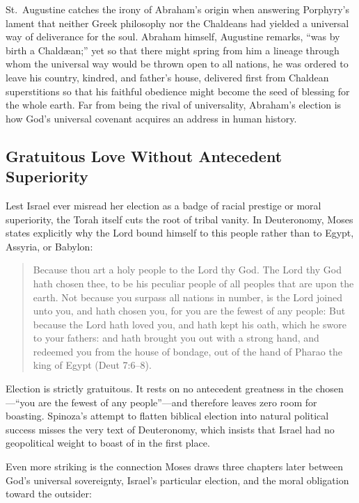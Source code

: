 St.\ Augustine catches the irony of Abraham's origin when answering Porphyry's lament that neither Greek philosophy nor the Chaldeans had yielded a universal way of deliverance for the soul. Abraham himself, Augustine remarks, ``was by birth a Chald\ae an;'' yet so that there might spring from him a lineage through whom the universal way would be thrown open to all nations, he was ordered to leave his country, kindred, and father's house, delivered first from Chaldean superstitions so that his faithful obedience might become the seed of blessing for the whole earth. Far from being the rival of universality, Abraham's election is how God's universal covenant acquires an address in human history.

\subsection{Gratuitous Love Without Antecedent Superiority}

Lest Israel ever misread her election as a badge of racial prestige or moral superiority, the Torah itself cuts the root of tribal vanity. In Deuteronomy, Moses states explicitly why the Lord bound himself to this people rather than to Egypt, Assyria, or Babylon:

\begin{quote}
Because thou art a holy people to the Lord thy God. The Lord thy God hath chosen thee, to be his peculiar people of all peoples that are upon the earth. Not because you surpass all nations in number, is the Lord joined unto you, and hath chosen you, for you are the fewest of any people: But because the Lord hath loved you, and hath kept his oath, which he swore to your fathers: and hath brought you out with a strong hand, and redeemed you from the house of bondage, out of the hand of Pharao the king of Egypt (Deut 7:6--8).
\end{quote}

Election is strictly gratuitous. It rests on no antecedent greatness in the chosen---``you are the fewest of any people''---and therefore leaves zero room for boasting. Spinoza's attempt to flatten biblical election into natural political success misses the very text of Deuteronomy, which insists that Israel had no geopolitical weight to boast of in the first place.

Even more striking is the connection Moses draws three chapters later between God's universal sovereignty, Israel's particular election, and the moral obligation toward the outsider:

